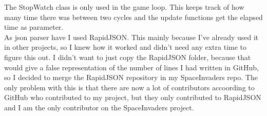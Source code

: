 \documentclass{article}
\begin{document}
	The StopWatch class is only used in the game loop. This keeps track of how many time there was between two cycles and the update functions get the elapsed time as parameter. \\
	As json parser have I used RapidJSON. This mainly because I've already used it in other projects, so I knew how it worked and didn't need any extra time to figure this out. I didn't want to just copy the RapidJSON folder, because that would give a false representation of the number of lines I had written in GitHub, so I decided to merge the RapidJSON repository in my SpaceInvaders repo. The only problem with this is that there are now a lot of contributors accoording to GitHub who contributed to my project, but they only contributed to RapidJSON and I am the only contributor on the SpaceInvaders project.
\end{document}
